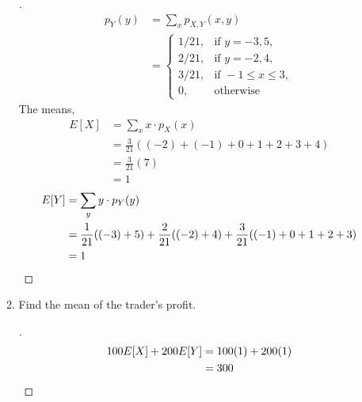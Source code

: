 \documentclass[paper=usletter, fontsize=12pt]{article}
\begin{document}
\begin{enumerate}[label=\textbf{\arabic*}.]
\begin{enumerate}[label=(\alph*)]
\begin{proof}[\unskip\nopunct]
\begin{align*}
                    p_{Y}(y) & = \sum_{x}p_{X,Y}(x,y) \\
                    & = \begin{cases}
                        1/21, & \text{if } y=-3,5, \\
                        2/21, & \text{if } y=-2,4, \\
                        3/21, & \text{if } -1 \le x \le 3, \\
                        0, & \text{otherwise}
                    \end{cases}
                \end{align*}
                \endgroup
                The means,\\
                \begingroup
                \addtolength{\jot}{1em}
                \begin{align*}
                    E[X] & = \sum_{x}x \cdot p_{X}(x) \\
                    & = \frac{3}{21}((-2)+(-1)+0+1+2+3+4)\\
                    & = \frac{3}{21}(7)\\
                    & = 1
                \end{align*}
                \endgroup
                \begingroup
                \addtolength{\jot}{1em}
                \begin{align*}
                    E[Y] & = \sum_{y}y \cdot p_{Y}(y) \\
                    & = \frac{1}{21}((-3)+5) + \frac{2}{21}((-2)+4) + \frac{3}{21}((-1)+0+1+2+3)\\
                    & = 1 \qedhere
                \end{align*}
                \endgroup
            \end{proof}
            \vspace{0.2in}

            \item Find the mean of the trader's profit.
            \begin{proof}[\unskip\nopunct]
                \vspace{-0.2in}
                \begin{align*}
                    100E[X] + 200E[Y] & = 100(1) + 200(1) \\
                    &= 300 \qedhere
                \end{align*}
            \end{proof}
            \vspace{0.2in}


\end{enumerate}
\end{enumerate}
\end{document}

